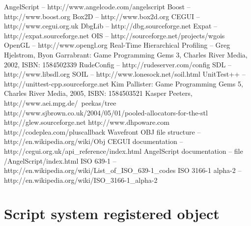 \documentclass[a4paper, 12pt]{report}
\begin{document}




\begin{thebibliography}{9}
AngelScript -- http://www.angelcode.com/angelscript
Boost -- http://www.boost.org
Box2D -- http://www.box2d.org
CEGUI -- http://www.cegui.org.uk
DbgLib -- http://dbg.sourceforge.net
Expat -- http://expat.sourceforge.net
OIS -- http://sourceforge.net/projects/wgois
OpenGL -- http://www.opengl.org
Real-Time Hierarchical Profiling -- Greg Hjelstrom, Byon Garrabrant: Game Programming Gems 3, Charles River Media, 2002, ISBN: 1584502339
RudeConfig -- http://rudeserver.com/config
SDL -- http://www.libsdl.org
SOIL -- http://www.lonesock.net/soil.html
UnitTest++ -- http://unittest-cpp.sourceforge.net
Kim Pallister: Game Programming Gems 5, Charles River Media, 2005, ISBN: 1584503521
Kasper Peeters, http://www.aei.mpg.de/~peekas/tree
http://www.sjbrown.co.uk/2004/05/01/pooled-allocators-for-the-stl
http://glew.sourceforge.net
http://www.dhpoware.com
http://codeplea.com/pluscallback
Wavefront OBJ file structure -- http://en.wikipedia.org/wiki/Obj
CEGUI documentation -- http://cegui.org.uk/api\_reference/index.html
AngelScript documentation -- file /AngelScript/index.html
ISO 639-1 -- http://en.wikipedia.org/wiki/List\_of\_ISO\_639-1\_codes
ISO 3166-1 alpha-2 -- http://en.wikipedia.org/wiki/ISO\_3166-1\_alpha-2
\end{thebibliography}



\clearpage
{}
\listoffigures

\clearpage
{}
\listoftables

\appendix

\chapter{Script system registered object}


\end{document}
